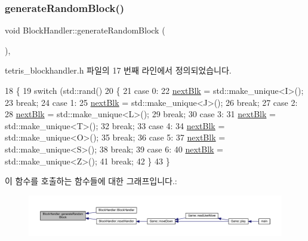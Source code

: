 \subsubsection{\texorpdfstring{generate\+Random\+Block()}{generateRandomBlock()}}
{\footnotesize\ttfamily void Block\+Handler\+::generate\+Random\+Block (\begin{DoxyParamCaption}{ }\end{DoxyParamCaption})\hspace{0.3cm}{\ttfamily [inline]}, {\ttfamily [private]}}



tetris\+\_\+blockhandler.\+h 파일의 17 번째 라인에서 정의되었습니다.


\begin{DoxyCode}
18     \{
19         \textcolor{keywordflow}{switch} (std::rand() %
20         \{
21         \textcolor{keywordflow}{case} 0:
22             \mbox{\hyperlink{class_block_handler_a7a7f96fa7c0d44f9e0fb5e52ebc9c428}{nextBlk}} = std::make\_unique<I>();
23             \textcolor{keywordflow}{break};
24         \textcolor{keywordflow}{case} 1:
25             \mbox{\hyperlink{class_block_handler_a7a7f96fa7c0d44f9e0fb5e52ebc9c428}{nextBlk}} = std::make\_unique<J>();
26             \textcolor{keywordflow}{break};
27         \textcolor{keywordflow}{case} 2:
28             \mbox{\hyperlink{class_block_handler_a7a7f96fa7c0d44f9e0fb5e52ebc9c428}{nextBlk}} = std::make\_unique<L>();
29             \textcolor{keywordflow}{break};
30         \textcolor{keywordflow}{case} 3:
31             \mbox{\hyperlink{class_block_handler_a7a7f96fa7c0d44f9e0fb5e52ebc9c428}{nextBlk}} = std::make\_unique<T>();
32             \textcolor{keywordflow}{break};
33         \textcolor{keywordflow}{case} 4:
34             \mbox{\hyperlink{class_block_handler_a7a7f96fa7c0d44f9e0fb5e52ebc9c428}{nextBlk}} = std::make\_unique<O>();
35             \textcolor{keywordflow}{break};
36         \textcolor{keywordflow}{case} 5:
37             \mbox{\hyperlink{class_block_handler_a7a7f96fa7c0d44f9e0fb5e52ebc9c428}{nextBlk}} = std::make\_unique<S>();
38             \textcolor{keywordflow}{break};
39         \textcolor{keywordflow}{case} 6:
40             \mbox{\hyperlink{class_block_handler_a7a7f96fa7c0d44f9e0fb5e52ebc9c428}{nextBlk}} = std::make\_unique<Z>();
41             \textcolor{keywordflow}{break};
42         \}
43     \}
\end{DoxyCode}
이 함수를 호출하는 함수들에 대한 그래프입니다.\+:
\nopagebreak
\begin{figure}[H]
\begin{center}
\leavevmode
\includegraphics[width=350pt]{class_block_handler_afaa88871c837a9af8fc407690aadffd6_icgraph}
\end{center}
\end{figure}
\mbox{\label{class_block_handler_a170a8b83b6df72530675d722a17fb8c4}} 
